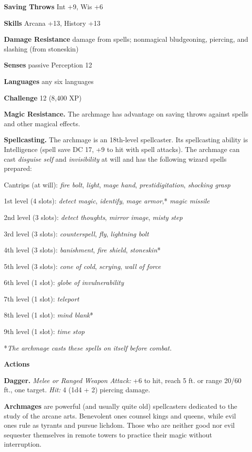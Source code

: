 \documentclass[
]{article}
\begin{document}
\textbf{Saving Throws} Int +9, Wis +6

\textbf{Skills} Arcana +13, History +13

\textbf{Damage Resistance} damage from spells; nonmagical bludgeoning,
piercing, and slashing (from stoneskin)

\textbf{Senses} passive Perception 12

\textbf{Languages} any six languages

\textbf{Challenge} 12 (8,400 XP)

\textbf{Magic Resistance.} The archmage has advantage on saving throws
against spells and other magical effects.

\textbf{Spellcasting.} The archmage is an 18th-level spellcaster. Its
spellcasting ability is Intelligence (spell save DC 17, +9 to hit with
spell attacks). The archmage can cast \emph{disguise self} and
\emph{invisibility} at will and has the following wizard spells
prepared:

Cantrips (at will): \emph{fire bolt}, \emph{light}, \emph{mage hand},
\emph{prestidigitation}, \emph{shocking grasp}

1st level (4 slots): \emph{detect magic}, \emph{identify}, \emph{mage
armor},* \emph{magic missile}

2nd level (3 slots): \emph{detect thoughts}, \emph{mirror image},
\emph{misty step}

3rd level (3 slots): \emph{counterspell}, \emph{fly}, \emph{lightning
bolt}

4th level (3 slots): \emph{banishment}, \emph{fire shield},
\emph{stoneskin}*

5th level (3 slots): \emph{cone of cold}, \emph{scrying}, \emph{wall of
force}

6th level (1 slot): \emph{globe of invulnerability}

7th level (1 slot): \emph{teleport}

8th level (1 slot): \emph{mind blank}*

9th level (1 slot): \emph{time stop}

*\emph{The archmage casts these spells on itself before combat.}

\textbf{Actions}

\textbf{Dagger.} \emph{Melee or Ranged Weapon Attack:} +6 to hit, reach
5 ft. or range 20/60 ft., one target. \emph{Hit:} 4 (1d4 + 2) piercing
damage.

\textbf{Archmages} are powerful (and usually quite old) spellcasters
dedicated to the study of the arcane arts. Benevolent ones counsel kings
and queens, while evil ones rule as tyrants and pursue lichdom. Those
who are neither good nor evil sequester themselves in remote towers to
practice their magic without interruption.
\end{document}

